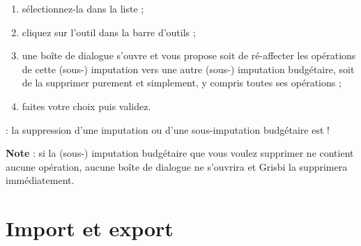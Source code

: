 \begin{enumerate}
	\ifIllustration
	\pichskip{11mm}
	\label{budgetarylines-delete-img}
	\fi
	
	 \item sélectionnez-la dans la liste ;
	 \item cliquez sur l'outil  dans la barre d'outils ;
	 \item une  boîte de dialogue s'ouvre et vous propose soit de ré-affecter les opérations de cette (sous-) imputation vers une autre (sous-) imputation budgétaire, soit de la supprimer purement et simplement, y compris toutes ses opérations ; 
	 \item faites votre choix puis validez.
\end{enumerate}

 : la suppression d'une imputation ou d'une sous-imputation budgétaire est  ! 

\textbf{Note} : si la (sous-) imputation budgétaire que vous voulez supprimer ne contient aucune opération, aucune boîte de dialogue ne s'ouvrira et Grisbi la supprimera immédiatement.

\ifIllustration
\fi


\section{Import et export\label{budgetarylines-importexport}}



